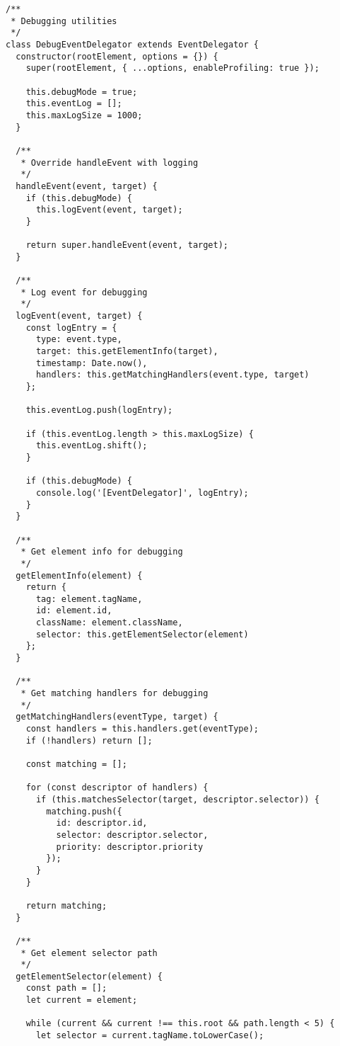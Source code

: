 \documentclass[11pt]{article}
\begin{document}
\begin{verbatim}
/**
 * Debugging utilities
 */
class DebugEventDelegator extends EventDelegator {
  constructor(rootElement, options = {}) {
    super(rootElement, { ...options, enableProfiling: true });
    
    this.debugMode = true;
    this.eventLog = [];
    this.maxLogSize = 1000;
  }
  
  /**
   * Override handleEvent with logging
   */
  handleEvent(event, target) {
    if (this.debugMode) {
      this.logEvent(event, target);
    }
    
    return super.handleEvent(event, target);
  }
  
  /**
   * Log event for debugging
   */
  logEvent(event, target) {
    const logEntry = {
      type: event.type,
      target: this.getElementInfo(target),
      timestamp: Date.now(),
      handlers: this.getMatchingHandlers(event.type, target)
    };
    
    this.eventLog.push(logEntry);
    
    if (this.eventLog.length > this.maxLogSize) {
      this.eventLog.shift();
    }
    
    if (this.debugMode) {
      console.log('[EventDelegator]', logEntry);
    }
  }
  
  /**
   * Get element info for debugging
   */
  getElementInfo(element) {
    return {
      tag: element.tagName,
      id: element.id,
      className: element.className,
      selector: this.getElementSelector(element)
    };
  }
  
  /**
   * Get matching handlers for debugging
   */
  getMatchingHandlers(eventType, target) {
    const handlers = this.handlers.get(eventType);
    if (!handlers) return [];
    
    const matching = [];
    
    for (const descriptor of handlers) {
      if (this.matchesSelector(target, descriptor.selector)) {
        matching.push({
          id: descriptor.id,
          selector: descriptor.selector,
          priority: descriptor.priority
        });
      }
    }
    
    return matching;
  }
  
  /**
   * Get element selector path
   */
  getElementSelector(element) {
    const path = [];
    let current = element;
    
    while (current && current !== this.root && path.length < 5) {
      let selector = current.tagName.toLowerCase();
      

\end{verbatim}
\end{document}
